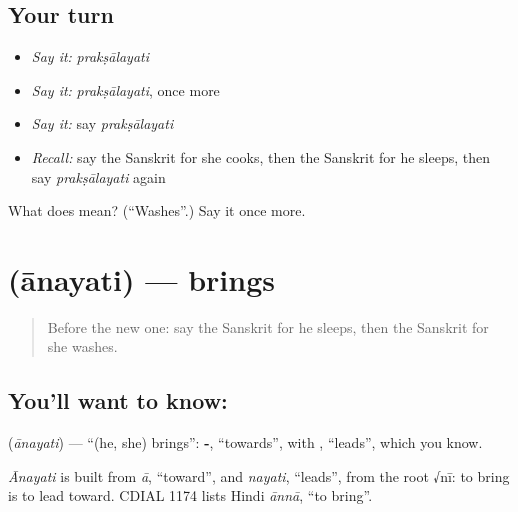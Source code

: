 \subsection*{Your turn}
\begin{itemize}
\raggedright
  \item \emph{Say it:} \emph{prakṣālayati}
  \item \emph{Say it:} \emph{prakṣālayati}, once more
  \item \emph{Say it:} say \emph{prakṣālayati}
  \item \emph{Recall:} say the Sanskrit for she cooks, then the Sanskrit for he sleeps, then say \emph{prakṣālayati} again
\end{itemize}

\begin{tcolorbox}[breakable,colback=teal!4,colframe=teal!35!black,title={Before you move on}]
What does  mean? (\textquotedblleft{}Washes\textquotedblright{}.) Say it once more.
\end{tcolorbox}
\section[\texorpdfstring{\sk{आनयति} (ānayati)}{आनयति (ānayati)}]{ (ānayati) — brings}

\label{lesson:SA-C72-brings}



\begin{quote}
Before the new one: say the Sanskrit for he sleeps, then the Sanskrit for she washes.
\end{quote}

\subsection*{You'll want to know: }
\textbf{} (\emph{ānayati}) — \textquotedblleft{}(he, she) brings\textquotedblright{}: \textbf{-}, \textquotedblleft{}towards\textquotedblright{}, with \textbf{}, \textquotedblleft{}leads\textquotedblright{}, which you know.

\begin{cousinweb}
\emph{Ānayati} is built from \emph{ā}, \textquotedblleft{}toward\textquotedblright{}, and \emph{nayati}, \textquotedblleft{}leads\textquotedblright{}, from the root √nī: to bring is to lead toward. CDIAL 1174 lists Hindi \emph{ānnā}, \textquotedblleft{}to bring\textquotedblright{}.
\end{cousinweb}

